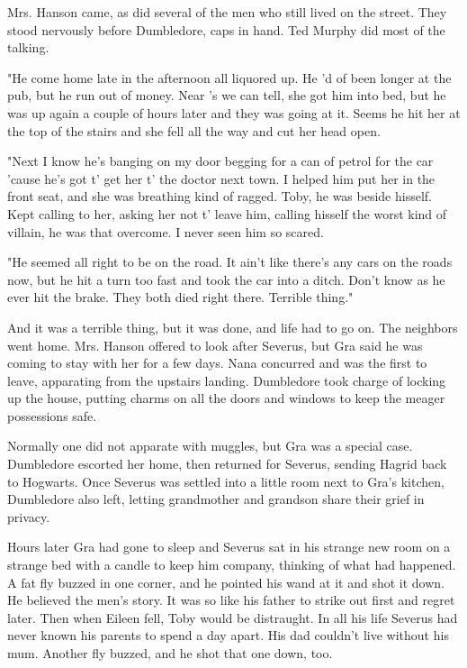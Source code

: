 \documentclass[a4paper,11pt]{article}
\begin{document}
Mrs. Hanson came, as did several of the men who still lived on the street. They stood nervously before Dumbledore, caps in hand. Ted Murphy did most of the talking.

"He come home late in the afternoon all liquored up. He 'd of been longer at the pub, but he run out of money. Near 's we can tell, she got him into bed, but he was up again a couple of hours later and they was going at it. Seems he hit her at the top of the stairs and she fell all the way and cut her head open.

"Next I know he's banging on my door begging for a can of petrol for the car 'cause he's got t' get her t' the doctor next town. I helped him put her in the front seat, and she was breathing kind of ragged. Toby, he was beside hisself. Kept calling to her, asking her not t' leave him, calling hisself the worst kind of villain, he was that overcome. I never seen him so scared.

"He seemed all right to be on the road. It ain't like there's any cars on the roads now, but he hit a turn too fast and took the car into a ditch. Don't know as he ever hit the brake. They both died right there. Terrible thing."

And it was a terrible thing, but it was done, and life had to go on. The neighbors went home. Mrs. Hanson offered to look after Severus, but Gra said he was coming to stay with her for a few days. Nana concurred and was the first to leave, apparating from the upstairs landing. Dumbledore took charge of locking up the house, putting charms on all the doors and windows to keep the meager possessions safe.

Normally one did not apparate with muggles, but Gra was a special case. Dumbledore escorted her home, then returned for Severus, sending Hagrid back to Hogwarts. Once Severus was settled into a little room next to Gra's kitchen, Dumbledore also left, letting grandmother and grandson share their grief in privacy.

Hours later Gra had gone to sleep and Severus sat in his strange new room on a strange bed with a candle to keep him company, thinking of what had happened. A fat fly buzzed in one corner, and he pointed his wand at it and shot it down. He believed the men's story. It was so like his father to strike out first and regret later. Then when Eileen fell, Toby would be distraught. In all his life Severus had never known his parents to spend a day apart. His dad couldn't live without his mum. Another fly buzzed, and he shot that one down, too.
\end{document}
